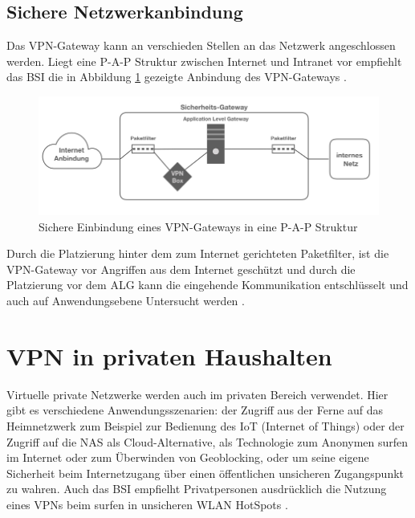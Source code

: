\subsection{Sichere Netzwerkanbindung}
Das VPN-Gateway kann an verschieden Stellen an das Netzwerk angeschlossen werden. Liegt eine P-A-P Struktur zwischen Internet und Intranet vor empfiehlt das BSI die in Abbildung \ref{vpnarch} gezeigte Anbindung des VPN-Gateways \cite{isi-lana}. 

\begin{figure}[h]
	\includegraphics[width=\linewidth]{vpnarchitektur.jpeg}
	\caption{Sichere Einbindung eines VPN-Gateways in eine P-A-P Struktur}
	\label{vpnarch}
\end{figure}

Durch die Platzierung hinter dem zum Internet gerichteten Paketfilter, ist die VPN-Gateway vor Angriffen aus dem Internet geschützt und durch die Platzierung vor dem ALG kann die eingehende Kommunikation entschlüsselt und auch auf Anwendungsebene Untersucht werden \cite{bsivpnaufbau}.\\
 

\section{VPN in privaten Haushalten}

Virtuelle private Netzwerke werden auch im privaten Bereich  verwendet. Hier gibt es verschiedene Anwendungsszenarien: der Zugriff aus der Ferne auf das Heimnetzwerk zum Beispiel zur Bedienung des IoT (Internet of Things) oder der Zugriff auf die NAS als Cloud-Alternative, als Technologie zum Anonymen surfen im Internet oder zum Überwinden von Geoblocking, oder um seine eigene Sicherheit beim Internetzugang über einen öffentlichen unsicheren Zugangspunkt zu wahren. Auch das BSI empfielht  Privatpersonen ausdrücklich die Nutzung eines VPNs beim surfen in unsicheren WLAN HotSpots \cite{bsibuergervpn}.

